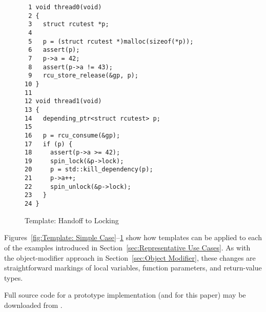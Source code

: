 \begin{figure}[tbp]
{ \scriptsize
\begin{verbatim}
 1 void thread0(void)
 2 {
 3   struct rcutest *p;
 4
 5   p = (struct rcutest *)malloc(sizeof(*p));
 6   assert(p);
 7   p->a = 42;
 8   assert(p->a != 43);
 9   rcu_store_release(&gp, p);
10 }
11
12 void thread1(void)
13 {
14   depending_ptr<struct rcutest> p;
15
16   p = rcu_consume(&gp);
17   if (p) {
18     assert(p->a >= 42);
19     spin_lock(&p->lock);
20     p = std::kill_dependency(p);
21     p->a++;
22     spin_unlock(&p->lock);
23   }
24 }
\end{verbatim}
}
\caption{Template: Handoff to Locking}
\label{fig:Template: Handoff to Locking}
\end{figure}

Figures~\ref{fig:Template: Simple Case}--\ref{fig:Template: Handoff to Locking}
show how templates can be applied to each of the examples
introduced in Section~\ref{sec:Representative Use Cases}.
As with the object-modifier approach in
Section~\ref{sec:Object Modifier},
these changes are straightforward markings of local variables, function
parameters, and return-value types.

Full source code for a prototype implementation
(and for this paper) may be downloaded from
{\small {}}.
